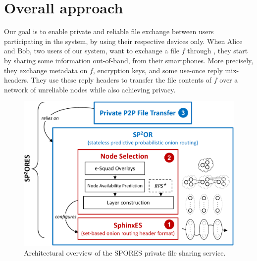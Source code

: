 \section{Overall approach}%
\label{approach}
Our goal is to enable private and reliable file exchange between users 
participating in the system, by using their respective devices only.
When Alice and Bob, two users of our system, want to exchange a file \(f\) 
through \name, they start by sharing some information out-of-band, \eg from 
their smartphones.
More precisely, they exchange metadata on \(f\), encryption keys, and
some use-once reply mix-headers.
They use these reply headers to transfer the file contents of \(f\) over a 
network of unreliable nodes while also achieving privacy.


\begin{figure}[t]
  \centering
  \def\svgwidth{0.8\columnwidth}
    \includegraphics[width=\columnwidth]{figures/OverviewSPORES_cropped}
    \caption{Architectural overview of the \ac{SPORES} private file sharing service.}
    \label{fig:outline}
\end{figure}

